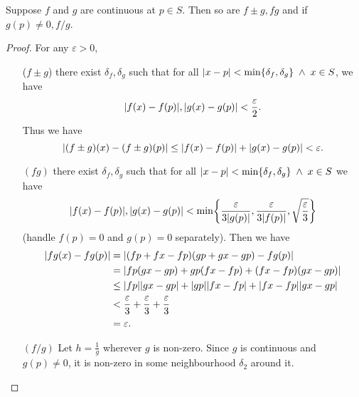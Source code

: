 \begin{thm} \label{thm:cont:laws}
    Suppose $f$ and $g$ are continuous at $p \in S$. Then so are $f \pm g, fg$ and if $g(p) \neq 0, f/g$.
\end{thm}
\begin{proof}
    For any $\varepsilon > 0$,
    \begin{enumerate}[label=(\alph*)]
        \item[($f \pm g$)] there exist $\delta_{f}, \delta_{g}$ such that for all $\abs{x - p} < \min \set{\delta_{f}, \delta_{g}} \;\land\; x \in S$, we have \[
            \abs{f(x) - f(p)}, \abs{g(x) - g(p)} < \frac{\varepsilon}{2}.
        \]
        Thus we have \[
            \abs{(f \pm g)(x) - (f \pm g)(p)} \leq \abs{f(x) - f(p)} + \abs{g(x) - g(p)} < \varepsilon.
        \] 
        \item[$(fg)$] there exist $\delta_{f}, \delta_{g}$ such that for all $\abs{x - p} < \min \set{\delta_{f}, \delta_{g}} \;\land\; x \in S$ we have \[
            \abs{f(x) - f(p)}, \abs{g(x) - g(p)} < \min\set{\frac{\varepsilon}{3\abs{g(p)}}, \frac{\varepsilon}{3\abs{f(p)}}, \sqrt{\frac{\varepsilon}{3}}}
        \]
        (handle $f(p) = 0$ and $g(p) = 0$ separately). Then we have
        \begin{align*}
            \abs{fg (x) - fg (p)} &= \abs{(fp + fx - fp)(gp + gx - gp) - fg(p)} \\
            &= \abs{fp (gx - gp) + gp (fx - fp) + (fx - fp)(gx - gp)} \\
            &\leq \abs{fp} \abs{gx - gp} + \abs{gp} \abs{fx - fp} + \abs{fx - fp} \abs{gx - gp} \\
            &< \frac{\varepsilon}{3} + \frac{\varepsilon}{3} + \frac{\varepsilon}{3} \\
            &= \varepsilon.
        \end{align*}

        \item[$(f/g)$] Let $h = \frac{1}{g}$ wherever $g$ is non-zero.
            Since $g$ is continuous and $g(p) \neq 0$, it is non-zero in some
            neighbourhood $\delta_{2}$ around it.


\end{enumerate}
\end{proof}
